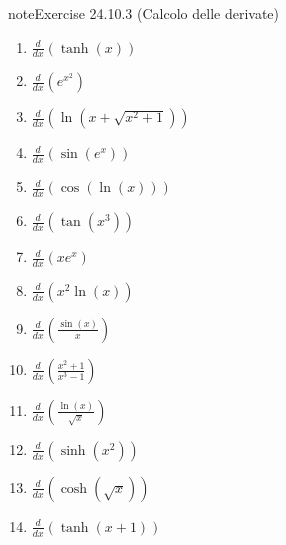 \documentclass[letterpaper,10pt,italian]{jupyterBook}
\begin{document}
\begin{sphinxadmonition}{note}{Exercise 24.10.3 (Calcolo delle derivate)}
\begin{enumerate}
\item {} 
\sphinxAtStartPar
\(\frac{d}{dx} \left(\tanh(x)\right)\)

\item {} 
\sphinxAtStartPar
\(\frac{d}{dx} \left(e^{x^2}\right)\)

\item {} 
\sphinxAtStartPar
\(\frac{d}{dx} \left(\ln(x + \sqrt{x^2 + 1})\right)\)

\item {} 
\sphinxAtStartPar
\(\frac{d}{dx} \left(\sin(e^x)\right)\)

\item {} 
\sphinxAtStartPar
\(\frac{d}{dx} \left(\cos(\ln(x))\right)\)

\item {} 
\sphinxAtStartPar
\(\frac{d}{dx} \left(\tan(x^3)\right)\)

\item {} 
\sphinxAtStartPar
\(\frac{d}{dx} \left(x e^x\right)\)

\item {} 
\sphinxAtStartPar
\(\frac{d}{dx} \left(x^2 \ln(x)\right)\)

\item {} 
\sphinxAtStartPar
\(\frac{d}{dx} \left(\frac{\sin(x)}{x}\right)\)

\item {} 
\sphinxAtStartPar
\(\frac{d}{dx} \left(\frac{x^2 + 1}{x^3 - 1}\right)\)

\item {} 
\sphinxAtStartPar
\(\frac{d}{dx} \left(\frac{\ln(x)}{\sqrt{x}}\right)\)

\item {} 
\sphinxAtStartPar
\(\frac{d}{dx} \left(\sinh(x^2)\right)\)

\item {} 
\sphinxAtStartPar
\(\frac{d}{dx} \left(\cosh(\sqrt{x})\right)\)

\item {} 
\sphinxAtStartPar
\(\frac{d}{dx} \left(\tanh(x + 1)\right)\)

\end{enumerate}
\end{sphinxadmonition}
 \label{exercise:ch/infinitesimal_calculus/derivatives-problems-exercise-3}
\end{document}
